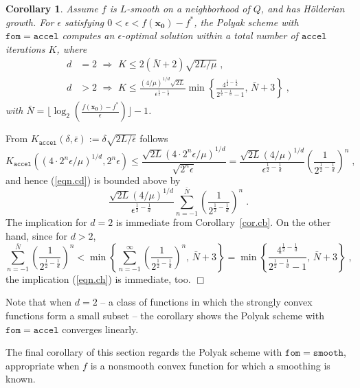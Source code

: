 \documentclass[reqno, 11pt]{amsart}
\newtheorem{cor}[prop]{Corollary}
\numberwithin{equation}{section}
\newcommand{\fom}{\mathtt{fom}}
\newcommand{\accel}{\mathtt{accel}}
\newcommand{\smooth}{\mathtt{smooth}}
\begin{document}
\begin{cor}  \label{cor.cd} 
Assume $ f $ is $ L $-smooth on a neighborhood of $ Q $, and has H\"{o}lderian growth. For $ \epsilon $ satisfying $ 0 < \epsilon < f( \mathbf{x_0}) - f^* $, the Polyak scheme with $ \fom = \accel $ computes an $ \epsilon $-optimal solution within a total number of $ \accel $ iterations $ K $, where
\begin{align}
  d & = 2  \, \,   \Rightarrow \, \,   K \leq  2 (\bar{N}+2) \sqrt{ 2 L/\mu}  \; ,     \label{eqn.cg} \\
  d &> 2 \, \,  \Rightarrow \, \,  K \leq  \frac{ (4/ \mu)^{1/d} \sqrt{2L}}{\epsilon^{ \frac{1}{2} - \frac{1}{d}}}   \min \left\{ \frac{4^{ \frac{1}{2} - \frac{1}{d}}}{2^{\frac{1}{2} - \frac{1}{d}} - 1}, \,  \bar{N} + 3 \right\}  \; , \label{eqn.ch} 
  \end{align}
with $ \bar{N} = \lfloor \log_2 \left(  \frac{f( \mathbf{x_0}) - f^*}{\epsilon} \right) \rfloor - 1 $.    
    \end{cor}
From $ K_{\accel}(\delta, \bar{\epsilon}   ) :=    \delta \sqrt{2 L/ \bar{\epsilon}  }   $ follows
\[  
     K_{\accel}( (4 \cdot 2^n \epsilon/ \mu)^{1/d}, 2^n \epsilon)  \leq  \frac{ \sqrt{2L}  (4 \cdot 2^n \epsilon/ \mu)^{1/d}}{\sqrt{2^n \epsilon }}  = \frac{ \sqrt{2L} (4/ \mu)^{1/d}}{ \epsilon^{ \frac{1}{2} - \frac{1}{d}}} \left( \frac{1}{2^{\frac{1}{2} - \frac{1}{d}}} \right)^n  \; ,              
\] 
and hence (\ref{eqn.cd}) is bounded above by 
\[  
  \frac{ \sqrt{2L} (4/ \mu)^{1/d}}{ \epsilon^{ \frac{1}{2} - \frac{1}{d}}}  \sum_{n = -1}^{\bar{N}}  \left( \frac{1}{2^{\frac{1}{2} - \frac{1}{d}}} \right)^n \; . 
\] 
The implication for $ d = 2 $  is immediate from Corollary~\ref{cor.cb}. On the other hand, since for $ d > 2 $, 
\[    
   \sum_{n=-1}^{\bar{N}} \left(  \frac{1}{ 2^{\frac{1}{2} - \frac{1}{d}}  } \right)^n < \min \left\{ \sum_{n=-1}^{\infty } \left(  \frac{1}{ 2^{\frac{1}{2} - \frac{1}{d}}}\right)^n, \, \bar{N} + 3 \right\} 
            = \min \left\{ \frac{4^{ \frac{1}{2} - \frac{1}{d}}}{2^{\frac{1}{2} - \frac{1}{d}} - 1}, \,  \bar{N} + 3 \right\} \; ,
\] 
the implication (\ref{eqn.ch})  is immediate, too.  \hfill $ \Box $

 Note that when $ d = 2 $ -- a class of functions in which the strongly convex functions form a small subset -- the corollary shows the Polyak scheme with $ \fom = \accel $ converges linearly.

The final corollary of this section regards the Polyak scheme with $ \fom = \smooth $, appropriate when $ f $ is a nonsmooth convex function for which a smoothing is known.
\end{document}
